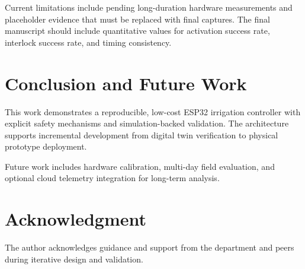 \documentclass[conference]{IEEEtran}
\begin{document}
Current limitations include pending long-duration hardware measurements and placeholder evidence that must be replaced with final captures. The final manuscript should include quantitative values for activation success rate, interlock success rate, and timing consistency.

\section{Conclusion and Future Work}
This work demonstrates a reproducible, low-cost ESP32 irrigation controller with explicit safety mechanisms and simulation-backed validation. The architecture supports incremental development from digital twin verification to physical prototype deployment.

Future work includes hardware calibration, multi-day field evaluation, and optional cloud telemetry integration for long-term analysis.

\section*{Acknowledgment}
The author acknowledges guidance and support from the department and peers during iterative design and validation.



\end{document}
